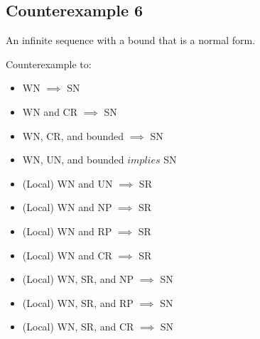 \documentclass{scrartcl}
\begin{document}
\subsection*{Counterexample 6}
An infinite sequence with a bound that is a normal form.
\begin{center}



    \end{center}
Counterexample to:
\begin{itemize}
  \item WN $\implies$ SN
  \item WN and CR $\implies$ SN
  \item WN, CR, and bounded $\implies$ SN
  \item WN, UN, and bounded $implies$ SN
  \item (Local) WN and UN $\implies$ SR
  \item (Local) WN and NP $\implies$ SR
  \item (Local) WN and RP $\implies$ SR
  \item (Local) WN and CR $\implies$ SR
  \item (Local) WN, SR, and NP $\implies$ SN
  \item (Local) WN, SR, and RP $\implies$ SN
  \item (Local) WN, SR, and CR $\implies$ SN
\end{itemize}
\end{document}
